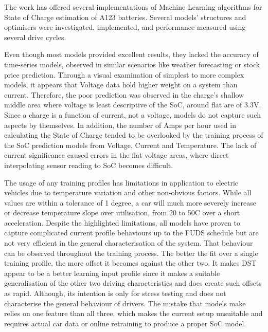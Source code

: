 The work has offered several implementations of Machine Learning algorithms for State of Charge estimation of A123 batteries.
Several models' structures and optimisers were investigated, implemented, and performance measured using several drive cycles.

%
%
Even though most models provided excellent results, they lacked the accuracy of time-series models, observed in similar scenarios like weather forecasting or stock price prediction.
Through a visual examination of simplest to more complex models, it appears that Voltage data hold higher weight on a system than current.
Therefore, the poor prediction was observed in the charge's shallow middle area where voltage is least descriptive of the SoC, around flat are of 3.3V.
Since a charge is a function of current, not a voltage, models do not capture such aspects by themselves.
In addition, the number of Amps per hour used in calculating the State of Charge tended to be overlooked by the training process of the SoC prediction models from Voltage, Current and Temperature.
The lack of current significance caused errors in the flat voltage areas, where direct interpolating sensor reading to SoC becomes difficult. 

%
%
The usage of any training profiles has limitations in application to electric vehicles due to temperature variation and other non-obvious factors.
While all values are within a tolerance of 1 degree, a car will much more severely increase or decrease temperature slope over utilisation, from 20 to 50\textdegree{}C over a short acceleration.
Despite the highlighted limitations, all models have proven to capture complicated current profile behaviours up to the FUDS schedule but are not very efficient in the general characterisation of the system.
That behaviour can be observed throughout the training process.
The better the fit over a single training profile, the more offset it becomes against the other two.
It makes DST appear to be a better learning input profile since it makes a suitable generalisation of the other two driving characteristics and does create such offsets as rapid.
Although, its intention is only for stress testing and does not characterise the general behaviour of drivers.
The mistake that models make relies on one feature than all three, which makes the current setup unsuitable and requires actual car data or online retraining to produce a proper SoC model.

